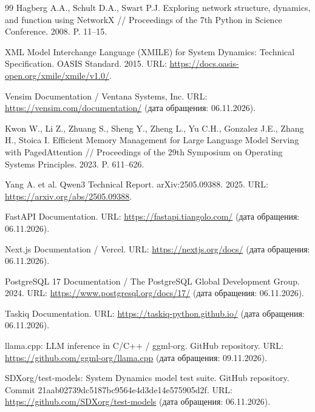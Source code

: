 \begin{thebibliography}{99}
Hagberg A.A., Schult D.A., Swart P.J. Exploring network structure, dynamics, and function using NetworkX // Proceedings of the 7th Python in Science Conference. 2008. P. 11--15.

XML Model Interchange Language (XMILE) for System Dynamics: Technical Specification. OASIS Standard. 2015. URL: \url{https://docs.oasis-open.org/xmile/xmile/v1.0/}.

Vensim Documentation / Ventana Systems, Inc. URL: \url{https://vensim.com/documentation/} (дата обращения: 06.11.2026).

Kwon W., Li Z., Zhuang S., Sheng Y., Zheng L., Yu C.H., Gonzalez J.E., Zhang H., Stoica I. Efficient Memory Management for Large Language Model Serving with PagedAttention // Proceedings of the 29th Symposium on Operating Systems Principles. 2023. P. 611--626.

Yang A. et al. Qwen3 Technical Report. arXiv:2505.09388. 2025. URL: \url{https://arxiv.org/abs/2505.09388}.

FastAPI Documentation. URL: \url{https://fastapi.tiangolo.com/} (дата обращения: 06.11.2026).

Next.js Documentation / Vercel. URL: \url{https://nextjs.org/docs/} (дата обращения: 06.11.2026).

PostgreSQL 17 Documentation / The PostgreSQL Global Development Group. 2024. URL: \url{https://www.postgresql.org/docs/17/} (дата обращения: 06.11.2026).

Taskiq Documentation. URL: \url{https://taskiq-python.github.io/} (дата обращения: 06.11.2026).

llama.cpp: LLM inference in C/C++ / ggml-org. GitHub repository. URL: \url{https://github.com/ggml-org/llama.cpp} (дата обращения: 09.11.2026).

SDXorg/test-models: System Dynamics model test suite. GitHub repository. Commit 21aab02739dc5187bc9564e4d3de14e575905d2f. URL: \url{https://github.com/SDXorg/test-models} (дата обращения: 06.11.2026).

\end{thebibliography}
